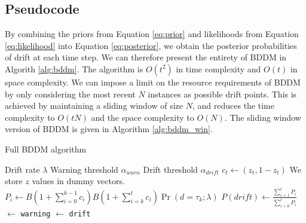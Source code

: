 \subsection{Pseudocode}

By combining the priors from Equation \ref{eq:prior} and likelihoods from Equation \ref{eq:likelihood} into Equation \ref{eq:posterior}, we obtain the posterior probabilities of drift at each time step. We can therefore present the entirety of BDDM in Algorith \ref{alg:bddm}. The algorithm is $O(t^2)$ in time complexity and $O(t)$ in space complexity. We can impose a limit on the resource requirements of BDDM by only considering the most recent $N$ instances as possible drift points. This is achieved by maintaining a sliding window of size $N$, and reduces the time complexity to $O(tN)$ and the space complexity to $O(N)$. The sliding window version of BDDM is given in Algorithm \ref{alg:bddm_win}.

\begin{algorithm}
    \caption{Full BDDM algorithm}
    \label{alg:bddm}
    \begin{algorithmic}
        \Require Drift rate $\lambda$
        \Require Warning threshold $\alpha_{warn}$
        \Require Drift threshold $\alpha_{drift}$
          \State $c_t \gets (z_t, 1-z_t)$
          \Comment We store $z$ values in dummy vectors.
            \State $P_i \gets B\left(1+\sum_{i=0}^{k-1}c_i\right) B\left(1+\sum_{i=k}^t c_i\right) \Pr(d=\tau_k;\lambda)$
          \EndFor
          \State $P(drift) \gets \frac{\sum_{i=1}^t P_i}{\sum_{i=0}^t P_i}$
             $\gets$ {\tt warning}
             $\gets$ {\tt drift}
          \EndIf
        \EndFor
    \end{algorithmic}
\end{algorithm}

